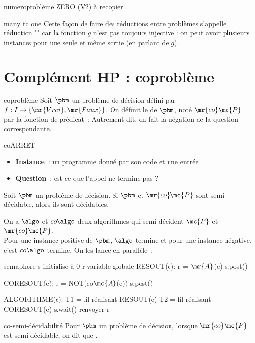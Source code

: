 \begin{exemple}{numero}{problème ZERO (V2)}
    à recopier
\end{exemple}

\begin{remarque}{}{many to one}
    Cette façon de faire des réductions entre problèmes s'appelle réduction "" car la fonction $g$ n'est pas toujours injective : on peut avoir plusieurs instances pour une seule et même sortie (en parlant de $g$).
\end{remarque}

\section{Complément HP : coproblème}

\newcommand{\copbm}{\mr{co}\mc{P}}


\begin{definition}{}{coproblème}
    Soit $\pbm$ un problème de décision défini par $f:I \to \{\mr{Vrai},\mr{Faux}\}$. On définit le  de $\pbm$, noté $\copbm$ par la fonction de prédicat~:
    Autrement dit, on fait la négation de la question correspondante.
\end{definition}

\begin{exemple}{}{coARRET}
    \begin{itemize}
        \item \textbf{Instance}~: un programme  donné par son code  et une entrée 
        \item \textbf{Question}~: est ce que l'appel  ne termine pas ?
    \end{itemize}
\end{exemple}

\begin{proposition}{}{}
    Soit $\pbm$ un problème de décision. Si $\pbm$ et $\copbm$ sont semi-décidable, alors ils sont décidables.
\end{proposition}

\begin{demonstration}
    On a $\algo$ et $co\algo$ deux algorithmes qui semi-décident $\mc{P}$ et $\copbm$.\\
    Pour une instance positive de $\pbm$, $\algo$ termine et pour une instance négative, c'est $co\algo$ termine. On les lance en parallèle~:
    \begin{lstLNat}
    semaphore s initialise à 0
    r variable globale
    RESOUT(e):
        r = $\mr{A}$(e)
        s.post()
    
    CORESOUT(e):
        r = NOT(co$\mc{A}$(e))
        s.post()

    ALGORITHME(e):
        T1 = fil réalisant RESOUT(e)
        T2 = fil réalisant CORESOUT(e)
        s.wait()
        renvoyer r
    \end{lstLNat}
\end{demonstration}

\begin{definition}{}{co-semi-décidabilité}
    Pour $\pbm$ un problème de décision, lorsque $\copbm$ est semi-décidable, on dit que .
\end{definition}

